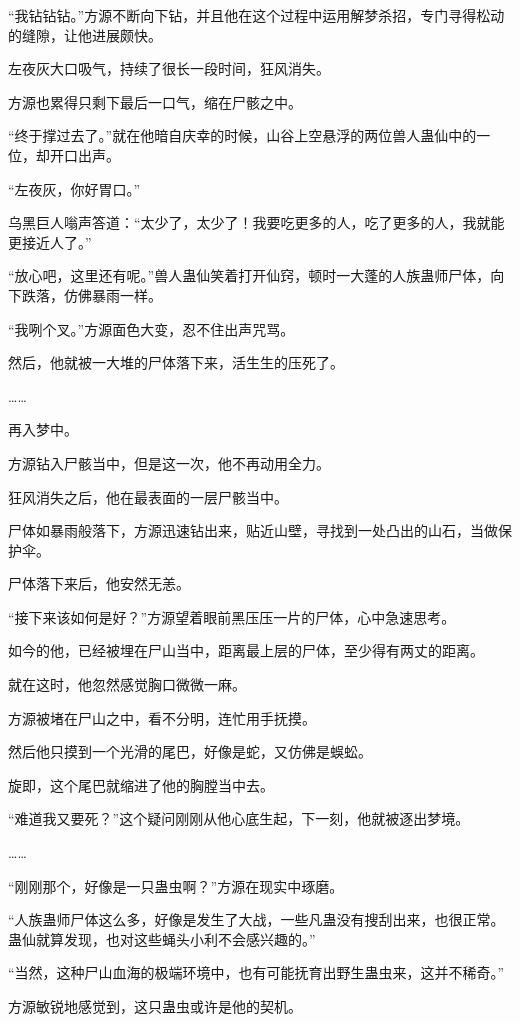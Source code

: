 \begin{this_body}
“我钻钻钻。”方源不断向下钻，并且他在这个过程中运用解梦杀招，专门寻得松动的缝隙，让他进展颇快。

左夜灰大口吸气，持续了很长一段时间，狂风消失。

方源也累得只剩下最后一口气，缩在尸骸之中。

“终于撑过去了。”就在他暗自庆幸的时候，山谷上空悬浮的两位兽人蛊仙中的一位，却开口出声。

“左夜灰，你好胃口。”

乌黑巨人嗡声答道：“太少了，太少了！我要吃更多的人，吃了更多的人，我就能更接近人了。”

“放心吧，这里还有呢。”兽人蛊仙笑着打开仙窍，顿时一大蓬的人族蛊师尸体，向下跌落，仿佛暴雨一样。

“我咧个叉。”方源面色大变，忍不住出声咒骂。

然后，他就被一大堆的尸体落下来，活生生的压死了。

……

再入梦中。

方源钻入尸骸当中，但是这一次，他不再动用全力。

狂风消失之后，他在最表面的一层尸骸当中。

尸体如暴雨般落下，方源迅速钻出来，贴近山壁，寻找到一处凸出的山石，当做保护伞。

尸体落下来后，他安然无恙。

“接下来该如何是好？”方源望着眼前黑压压一片的尸体，心中急速思考。

如今的他，已经被埋在尸山当中，距离最上层的尸体，至少得有两丈的距离。

就在这时，他忽然感觉胸口微微一麻。

方源被堵在尸山之中，看不分明，连忙用手抚摸。

然后他只摸到一个光滑的尾巴，好像是蛇，又仿佛是蜈蚣。

旋即，这个尾巴就缩进了他的胸膛当中去。

“难道我又要死？”这个疑问刚刚从他心底生起，下一刻，他就被逐出梦境。

……

“刚刚那个，好像是一只蛊虫啊？”方源在现实中琢磨。

“人族蛊师尸体这么多，好像是发生了大战，一些凡蛊没有搜刮出来，也很正常。蛊仙就算发现，也对这些蝇头小利不会感兴趣的。”

“当然，这种尸山血海的极端环境中，也有可能抚育出野生蛊虫来，这并不稀奇。”

方源敏锐地感觉到，这只蛊虫或许是他的契机。


\end{this_body}
